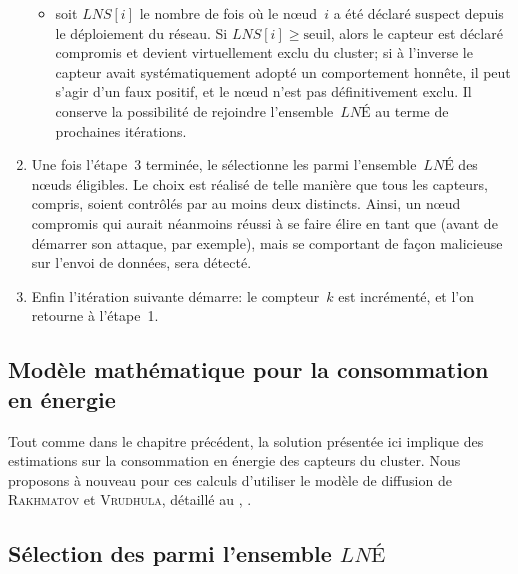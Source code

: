 \begin{enumerate}
\begin{itemize}
            \item soit $\mathit{LNS}[i]$ le nombre de fois où le nœud~$i$ a été déclaré suspect depuis le déploiement du réseau. Si $\mathit{LNS}[i] \ge \mathrm{seuil}$, alors le capteur est déclaré compro\-mis et devient virtuellement exclu du cluster; si à l'inverse le capteur avait systématiquement adopté un comportement honnête, il peut s'agir d'un faux positif, et le nœud n'est pas définitivement exclu. Il conserve la possibilité de rejoindre l'ensemble~$\mathit{LNÉ}$ au terme de prochaines itérations.
        \end{itemize}
    \item Une fois l'étape~3 terminée, le \CH sélectionne les \cns parmi l'ensemble~$\mathit{LNÉ}$ des nœuds éligibles. Le choix est réalisé de telle manière que tous les capteurs, \cns compris, soient contrôlés par au moins deux \cns distincts. Ainsi, un nœud compromis qui aurait néanmoins réussi à se faire élire en tant que \cn (avant de démarrer son attaque, par exemple), mais se comportant de façon malicieuse sur l'envoi de données, sera détecté.
    \item Enfin l'itération suivante démarre: le compteur~$k$ est incrémenté, et l'on retourne à l'étape~1.
\end{enumerate}

    \subsection{Modèle mathématique pour la consommation en énergie}

Tout comme dans le chapitre précédent, la solution présentée ici implique des estimations sur la consommation en énergie des capteurs du cluster.
Nous proposons à nouveau pour ces calculs d'utiliser le modèle de diffusion de \textsc{Rakhmatov} et \textsc{Vrudhula}, détaillé au , .

    \subsection{Sélection des \cns parmi l'ensemble $\mathit{LNÉ}$}

